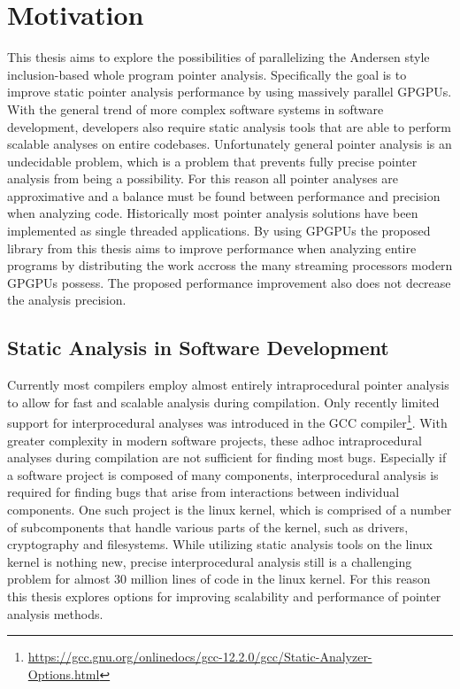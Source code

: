 \section{Motivation}
This thesis aims to explore the possibilities of parallelizing the Andersen style inclusion-based whole program pointer analysis. Specifically the goal is to improve static pointer analysis performance by using massively parallel GPGPUs.
With the general trend of more complex software systems in software development, developers also require static analysis tools that are able to perform scalable analyses on entire codebases.
Unfortunately general pointer analysis is an undecidable problem, which is a problem that prevents fully precise pointer analysis from being a possibility.
For this reason all pointer analyses are approximative and a balance must be found between performance and precision when analyzing code.
Historically most pointer analysis solutions have been implemented as single threaded applications. By using GPGPUs the proposed library from this thesis aims to improve performance when analyzing entire programs by distributing the work accross the many streaming processors modern GPGPUs possess. The proposed performance improvement also does not decrease the analysis precision.
\subsection{Static Analysis in Software Development}
Currently most compilers employ almost entirely intraprocedural pointer analysis to allow for fast and scalable analysis during compilation. Only recently limited support for interprocedural analyses was introduced in the GCC compiler\footnote{\url{https://gcc.gnu.org/onlinedocs/gcc-12.2.0/gcc/Static-Analyzer-Options.html}}.
With greater complexity in modern software projects, these adhoc intraprocedural analyses during compilation are not sufficient for finding most bugs.
Especially if a software project is composed of many components, interprocedural analysis is required for finding bugs that arise from interactions between individual components.
One such project is the linux kernel, which is comprised of a number of subcomponents that handle various parts of the kernel, such as drivers, cryptography and filesystems.
While utilizing static analysis tools on the linux kernel is nothing new, precise interprocedural analysis still is a challenging problem for almost 30 million lines of code in the linux kernel.
For this reason this thesis explores options for improving scalability and performance of pointer analysis methods.

